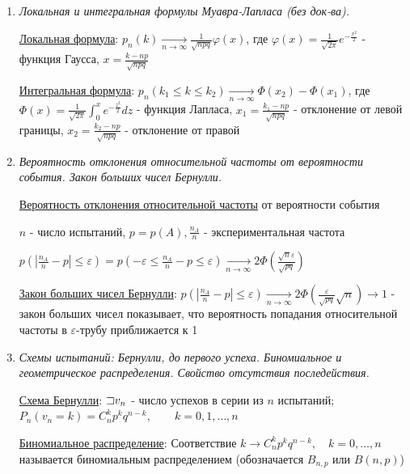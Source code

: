 \documentclass[12pt]{article}
\begin{document}
\begin{enumerate}
    \item \textit{Локальная и интегральная формулы Муавра-Лапласа (без док-ва).}

    \hyperlink{localformulademoivrelaplace}{Локальная формула}: $p_n(k) \underset{n \to \infty}{\longrightarrow} \frac{1}{\sqrt{npq}} \varphi(x)$, где $\varphi(x) = \frac{1}{\sqrt{2\pi}} e^{-\frac{x^2}{2}}$ - функция Гаусса, 
    $x = \frac{k - np}{\sqrt{npq}}$

    \hyperlink{integralformulademoivrelaplace}{Интегральная формула}: $p_n(k_1 \leq k \leq k_2) \underset{n \to \infty}{\longrightarrow} \Phi(x_2) - \Phi(x_1)$, где $\Phi(x) = \frac{1}{\sqrt{2\pi}} \int_0^x e^{-\frac{z^2}{2}} dz$ - функция Лапласа,
    $x_1 = \frac{k_1 - np}{\sqrt{npq}}$ - отклонение от левой границы, $x_2 = \frac{k_2 - np}{\sqrt{npq}}$ - отклонение от правой

    \item \textit{Вероятность отклонения относительной частоты от вероятности события. Закон больших чисел Бернулли.}

    \hyperlink{probabilityofdeviation}{Вероятность отклонения относительной частоты} от вероятности события

    $n$ - число испытаний, $p = p(A), \frac{n_A}{n}$ - экспериментальная частота

    $p\left(|\frac{n_A}{n} - p| \leq \varepsilon\right) = p\left(-\varepsilon \leq \frac{n_A}{n} - p \leq \varepsilon\right) \underset{n \to \infty}{\longrightarrow} 2\Phi\left(\frac{\sqrt{n}\varepsilon}{\sqrt{pq}}\right)$

    \hyperlink{lawofbignumbersbernoulli}{Закон больших чисел Бернулли}: $p\left(|\frac{n_A}{n} - p| \leq \varepsilon\right) \underset{n \to \infty}{\longrightarrow} 2 \Phi\left(\frac{\varepsilon}{\sqrt{pq}}\sqrt{n}\right) \to 1$ - 
    закон больших чисел показывает, что вероятность попадания относительной частоты в $\varepsilon$-трубу приближается к 1

    \item \textit{Схемы испытаний: Бернулли, до первого успеха. Биномиальное и геометрическое распределения. Свойство отсутствия последействия.}

    \hyperlink{bernoullischema2}{Схема Бернулли}: $\mathord{\sqsupset} v_n$ - число успехов в серии из $n$ испытаний; 
    $P_n(v_n = k) = C^k_n p^k q^{n - k}, \quad\quad k = 0, 1, \dots, n$

    \hyperlink{binomialdistribution}{Биномиальное распределение}: Соответствие $k \rightarrow C^k_n p^k q^{n - k}, \quad k = 0, \dots, n$ называется биномиальным распределением
    (обозначается $B_{n,p}$ или $B(n, p)$)


\end{enumerate}
\end{document}
